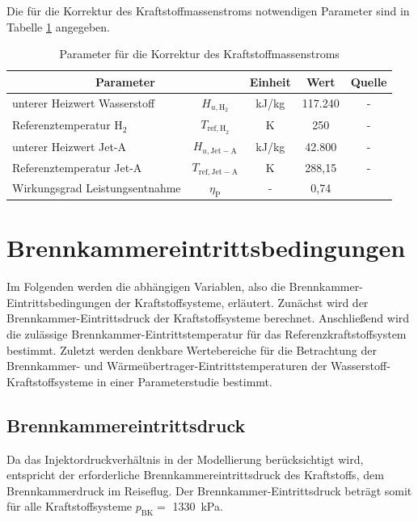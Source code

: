Die für die Korrektur des Kraftstoffmassenstroms notwendigen Parameter sind in Tabelle \ref{Tab:pot_parametriert} angegeben.

\begin{table}[ht]
    \centering
	\caption{Parameter für die Korrektur des Kraftstoffmassenstroms}
	\begin{tabular} {|l|c|c|c|c|} \hline%
    \multicolumn{2}{|c|}{Parameter} & Einheit & Wert & Quelle\\ \hline\hline%
    unterer Heizwert Wasserstoff & $H_{u, \mathrm{H}_2}$ & kJ/kg & 117.240 & - \\ \hline
    Referenztemperatur H$_2$ & $T_{\mathrm{ref,H}_2}$ & K & 250 & - \\ \hline
    unterer Heizwert Jet-A & $H_{u, \mathrm{Jet-A}}$ & kJ/kg & 42.800 & - \\ \hline
    Referenztemperatur Jet-A & $T_\mathrm{ref,Jet-A}$ & K & 288,15 & - \\ \hline   
    Wirkungsgrad Leistungsentnahme & $\eta_\mathrm{P}$ & - & 0,74 & \cite{Scholz.2013} \\ \hline
	\end{tabular}	
    \label{Tab:pot_parametriert}%
\end{table}
\FloatBarrier 

\section{Brennkammereintrittsbedingungen}

Im Folgenden werden die abhängigen Variablen, also die Brennkammer-Eintrittsbedingungen der Kraftstoffsysteme, erläutert. Zunächst wird der Brennkammer-Eintrittsdruck der Kraftstoffsysteme berechnet. Anschließend wird die zulässige Brennkammer-Eintrittstemperatur für das Referenzkraftstoffsystem bestimmt. Zuletzt werden denkbare Wertebereiche für die Betrachtung der Brennkammer- und Wärmeübertrager-Eintrittstemperaturen der Wasserstoff-Kraftstoffsysteme in einer Parameterstudie bestimmt.

\subsection{Brennkammereintrittsdruck}

Da das Injektordruckverhältnis in der Modellierung berücksichtigt wird, entspricht der erforderliche Brennkammereintrittsdruck des Kraftstoffs, dem Brennkammerdruck im Reiseflug. Der Brennkammer-Eintrittsdruck beträgt somit für alle Kraftstoffsysteme $p_\mathrm{BK}=$ \SI{1330}{\kilo\Pa}.


